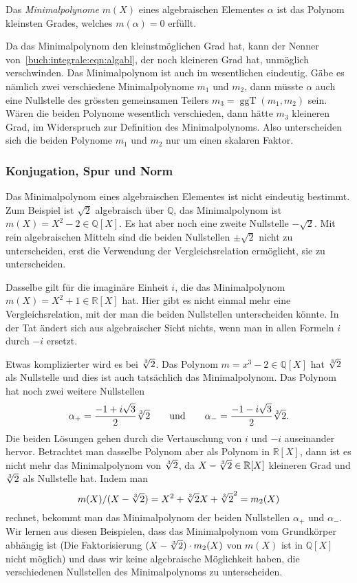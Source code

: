 \begin{definition}
Das {\em Minimalpolynome} $m(X)$ eines algebraischen Elementes $\alpha$ ist
das Polynom kleinsten Grades, welches $m(\alpha)=0$ erfüllt.
\end{definition}

Da das Minimalpolynom den kleinstmöglichen Grad hat, kann der Nenner
von~\eqref{buch:integrale:eqn:algabl},
der noch kleineren Grad hat, unmöglich verschwinden.
Das Minimalpolynom ist auch im wesentlichen eindeutig.
Gäbe es nämlich zwei verschiedene Minimalpolynome $m_1$ und $m_2$,
dann müsste $\alpha$ auch eine Nullstelle des grössten gemeinsamen
Teilers $m_3=\operatorname{ggT}(m_1,m_2)$ sein.
Wären die beiden Polynome wesentlich verschieden, dann hätte $m_3$
kleineren Grad, im Widerspruch zur Definition des Minimalpolynoms.
Also unterscheiden sich die beiden Polynome $m_1$ und $m_2$ nur um
einen skalaren Faktor.

\subsubsection{Konjugation, Spur und Norm}
Das Minimalpolynom eines algebraischen Elementes ist nicht
eindeutig bestimmt.
Zum Beispiel ist $\sqrt{2}$ algebraisch über $\mathbb{Q}$, das
Minimalpolynom ist $m(X)=X^2-2\in\mathbb{Q}[X]$. 
Es hat aber noch eine zweite Nullstelle $-\sqrt{2}$.
Mit rein algebraischen Mitteln sind die beiden Nullstellen $\pm\sqrt{2}$
nicht zu unterscheiden, erst die Verwendung der Vergleichsrelation
ermöglicht, sie zu unterscheiden.

Dasselbe gilt für die imaginäre Einheit $i$, die das Minimalpolynom
$m(X)=X^2+1\in\mathbb{R}[X]$ hat.
Hier gibt es nicht einmal mehr eine Vergleichsrelation, mit der man
die beiden Nullstellen unterscheiden könnte.
In der Tat ändert sich aus algebraischer Sicht nichts, wenn man in
allen Formeln $i$ durch $-i$ ersetzt.

Etwas komplizierter wird es bei $\root{3}\of{2}$.
Das Polynom $m=x^3-2\in\mathbb{Q}[X]$ hat $\root{3}\of{2}$ als
Nullstelle und dies ist auch tatsächlich das Minimalpolynom.
Das Polynom hat noch zwei weitere Nullstellen
\[
\alpha_+ = \frac{-1+i\sqrt{3}}{2}\root{3}\of{2}
\qquad\text{und}\qquad
\alpha_- = \frac{-1-i\sqrt{3}}{2}\root{3}\of{2}.
\]
Die beiden Lösungen gehen durch die Vertauschung von $i$ und $-i$ 
auseinander hervor.
Betrachtet man dasselbe Polynom aber als Polynom in $\mathbb{R}[X]$,
dann ist es nicht mehr das Minimalpolynom von $\root{3}\of{2}$, da
$X-\root{3}\of{2}\in\mathbb{R}[X]$ kleineren Grad und $\root{3}\of{2}$
als Nullstelle hat.
Indem man
\[
m(X)/(X-\root{3}\of{2})=X^2+\root{3}\of{2}X+\root{3}\of{2}^2=m_2(X)
\]
rechnet, bekommt man das Minimalpolynom der beiden Nullstellen $\alpha_+$
und $\alpha_-$.
Wir lernen aus diesen Beispielen, dass das Minimalpolynom vom Grundkörper
abhängig ist (Die Faktorisierung $(X-\root{3}\of{2})\cdot m_2(X)$ von
$m(X)$ ist in $\mathbb{Q}[X]$ nicht möglich) und dass wir keine 
algebraische Möglichkeit haben, die verschiedenen Nullstellen des
Minimalpolynoms zu unterscheiden.

